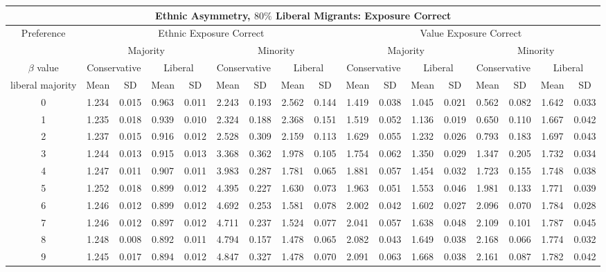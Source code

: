\documentclass{article}
\begin{document}
\begin{table}[H]
{\begin{tabular}{|c|c|c|c|c|c|c|c|c|c|c|c|c|c|c|c|c|}
  \multicolumn{17}{|c|}{Ethnic Asymmetry, $80 \%$ Liberal Migrants: Exposure Correct}  \\\hline
 Preference &  \multicolumn{8}{|c|}{Ethnic Exposure Correct} & \multicolumn{8}{|c|}{Value Exposure Correct}   \\\hline
 & \multicolumn{4}{|c|}{Majority} & \multicolumn{4}{|c|}{Minority}  & \multicolumn{4}{|c|}{Majority} & \multicolumn{4}{|c|}{Minority}  \\
 $\beta$ value & \multicolumn{2}{|c|}{Conservative} & \multicolumn{2}{|c|}{Liberal} 
& \multicolumn{2}{|c|}{Conservative} & \multicolumn{2}{|c|}{Liberal} & \multicolumn{2}{|c|}{Conservative} & \multicolumn{2}{|c|}{Liberal} 
& \multicolumn{2}{|c|}{Conservative} & \multicolumn{2}{|c|}{Liberal}\\
 liberal majority & Mean & SD & Mean & SD & Mean & SD & Mean & SD & Mean & SD & Mean & SD & Mean & SD & Mean & SD\\
 \hline
   0 & 1.234 & 0.015 & 0.963 & 0.011 & 2.243 & 0.193 & 2.562 & 0.144 & 1.419 & 0.038 & 1.045 & 0.021 & 0.562 & 0.082 & 1.642 & 0.033 \\ 
     1 & 1.235 & 0.018 & 0.939 & 0.010 & 2.324 & 0.188 & 2.368 & 0.151 & 1.519 & 0.052 & 1.136 & 0.019 & 0.650 & 0.110 & 1.667 & 0.042 \\ 
     2 & 1.237 & 0.015 & 0.916 & 0.012 & 2.528 & 0.309 & 2.159 & 0.113 & 1.629 & 0.055 & 1.232 & 0.026 & 0.793 & 0.183 & 1.697 & 0.043 \\ 
     3 & 1.244 & 0.013 & 0.915 & 0.013 & 3.368 & 0.362 & 1.978 & 0.105 & 1.754 & 0.062 & 1.350 & 0.029 & 1.347 & 0.205 & 1.732 & 0.034 \\ 
     4 & 1.247 & 0.011 & 0.907 & 0.011 & 3.983 & 0.287 & 1.781 & 0.065 & 1.881 & 0.057 & 1.454 & 0.032 & 1.723 & 0.155 & 1.748 & 0.038 \\ 
     5 & 1.252 & 0.018 & 0.899 & 0.012 & 4.395 & 0.227 & 1.630 & 0.073 & 1.963 & 0.051 & 1.553 & 0.046 & 1.981 & 0.133 & 1.771 & 0.039 \\ 
     6 & 1.246 & 0.012 & 0.899 & 0.012 & 4.692 & 0.253 & 1.581 & 0.078 & 2.002 & 0.042 & 1.602 & 0.027 & 2.096 & 0.070 & 1.784 & 0.028 \\ 
     7 & 1.246 & 0.012 & 0.897 & 0.012 & 4.711 & 0.237 & 1.524 & 0.077 & 2.041 & 0.057 & 1.638 & 0.048 & 2.109 & 0.101 & 1.787 & 0.045 \\ 
     8 & 1.248 & 0.008 & 0.892 & 0.011 & 4.794 & 0.157 & 1.478 & 0.065 & 2.082 & 0.043 & 1.649 & 0.038 & 2.168 & 0.066 & 1.774 & 0.032 \\ 
     9 & 1.245 & 0.017 & 0.894 & 0.012 & 4.847 & 0.327 & 1.478 & 0.070 & 2.091 & 0.063 & 1.668 & 0.038 & 2.161 & 0.087 & 1.782 & 0.042 \\ 

\end{tabular}}
\end{table}
\end{document}
